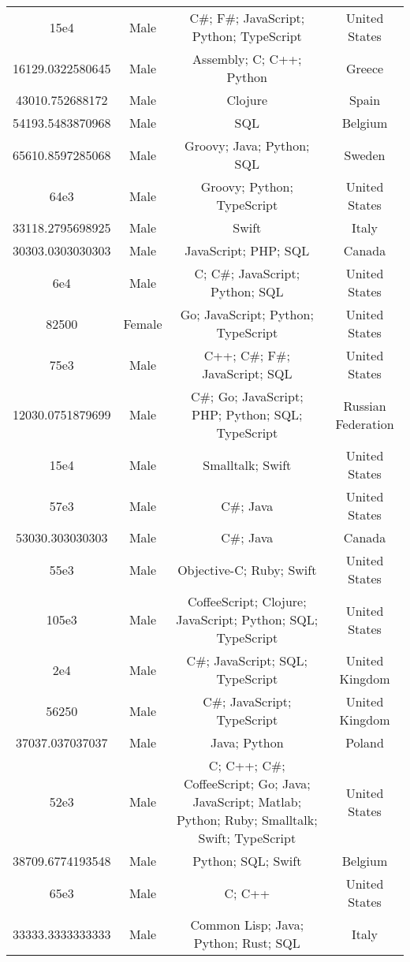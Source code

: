 \begin{center}
\begin{tabular}{ |c|c|c|c| }
15e4  &  Male  &  C\#; F\#; JavaScript; Python; TypeScript  &  United States  \\ 
16129.0322580645  &  Male  &  Assembly; C; C++; Python  &  Greece  \\ 
43010.752688172  &  Male  &  Clojure  &  Spain  \\ 
54193.5483870968  &  Male  &  SQL  &  Belgium  \\ 
65610.8597285068  &  Male  &  Groovy; Java; Python; SQL  &  Sweden  \\ 
64e3  &  Male  &  Groovy; Python; TypeScript  &  United States  \\ 
33118.2795698925  &  Male  &  Swift  &  Italy  \\ 
30303.0303030303  &  Male  &  JavaScript; PHP; SQL  &  Canada  \\ 
6e4  &  Male  &  C; C\#; JavaScript; Python; SQL  &  United States  \\ 
82500  &  Female  &  Go; JavaScript; Python; TypeScript  &  United States  \\ 
75e3  &  Male  &  C++; C\#; F\#; JavaScript; SQL  &  United States  \\ 
12030.0751879699  &  Male  &  C\#; Go; JavaScript; PHP; Python; SQL; TypeScript  &  Russian Federation  \\ 
15e4  &  Male  &  Smalltalk; Swift  &  United States  \\ 
57e3  &  Male  &  C\#; Java  &  United States  \\ 
53030.303030303  &  Male  &  C\#; Java  &  Canada  \\ 
55e3  &  Male  &  Objective-C; Ruby; Swift  &  United States  \\ 
105e3  &  Male  &  CoffeeScript; Clojure; JavaScript; Python; SQL; TypeScript  &  United States  \\ 
2e4  &  Male  &  C\#; JavaScript; SQL; TypeScript  &  United Kingdom  \\ 
56250  &  Male  &  C\#; JavaScript; TypeScript  &  United Kingdom  \\ 
37037.037037037  &  Male  &  Java; Python  &  Poland  \\ 
52e3  &  Male  &  C; C++; C\#; CoffeeScript; Go; Java; JavaScript; Matlab; Python; Ruby; Smalltalk; Swift; TypeScript  &  United States  \\ 
38709.6774193548  &  Male  &  Python; SQL; Swift  &  Belgium  \\ 
65e3  &  Male  &  C; C++  &  United States  \\ 
33333.3333333333  &  Male  &  Common Lisp; Java; Python; Rust; SQL  &  Italy  \\ 

\end{tabular}
\end{center}
